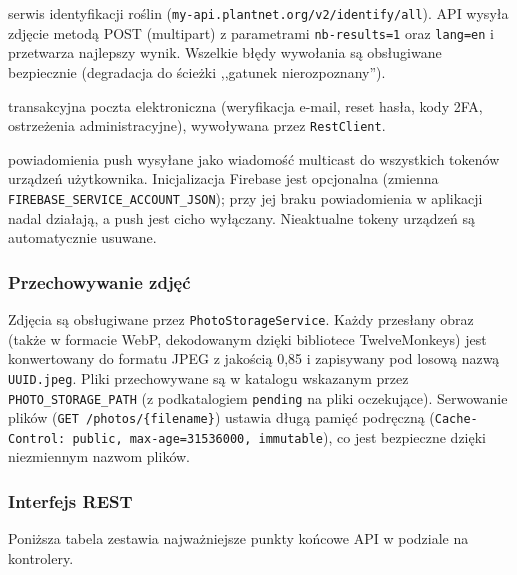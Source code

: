 \documentclass[12pt,a4paper]{article}
\begin{document}
\begin{description}[leftmargin=1.4cm, style=nextline]
    \item[PlantNet] serwis identyfikacji ro\'slin (\texttt{my-api.plantnet.org/v2/identify/all}). API wysy\l{}a zdj\k{e}cie metod\k{a} POST (multipart) z parametrami \texttt{nb-results=1} oraz \texttt{lang=en} i przetwarza najlepszy wynik. Wszelkie b\l{}\k{e}dy wywo\l{}ania s\k{a} obs\l{}ugiwane bezpiecznie (degradacja do \'scie\.zki ,,gatunek nierozpoznany'').
    \item[Brevo] transakcyjna poczta elektroniczna (weryfikacja e-mail, reset has\l{}a, kody 2FA, ostrze\.zenia administracyjne), wywo\l{}ywana przez \texttt{RestClient}.
    \item[Firebase Cloud Messaging] powiadomienia push wysy\l{}ane jako wiadomo\'s\'c multicast do wszystkich token\'ow urz\k{a}dze\'n u\.zytkownika. Inicjalizacja Firebase jest opcjonalna (zmienna \texttt{FIREBASE\_\allowbreak{}SERVICE\_\allowbreak{}ACCOUNT\_\allowbreak{}JSON}); przy jej braku powiadomienia w aplikacji nadal dzia\l{}aj\k{a}, a push jest cicho wy\l{}\k{a}czany. Nieaktualne tokeny urz\k{a}dze\'n s\k{a} automatycznie usuwane.
\end{description}

\subsubsection{Przechowywanie zdj\k{e}\'c}

Zdj\k{e}cia s\k{a} obs\l{}ugiwane przez \texttt{PhotoStorageService}. Ka\.zdy przes\l{}any obraz (tak\.ze w formacie WebP, dekodowanym dzi\k{e}ki bibliotece TwelveMonkeys) jest konwertowany do formatu JPEG z jako\'sci\k{a} 0,85 i zapisywany pod losow\k{a} nazw\k{a} \texttt{UUID.jpeg}. Pliki przechowywane s\k{a} w katalogu wskazanym przez \texttt{PHOTO\_STORAGE\_PATH} (z podkatalogiem \texttt{pending} na pliki oczekuj\k{a}ce). Serwowanie plik\'ow (\texttt{GET /photos/\{filename\}}) ustawia d\l{}ug\k{a} pami\k{e}\'c podr\k{e}czn\k{a} (\texttt{Cache-Control: public, max-age=31536000, immutable}), co jest bezpieczne dzi\k{e}ki niezmiennym nazwom plik\'ow.

\subsubsection{Interfejs REST}

Poni\.zsza tabela zestawia najwa\.zniejsze punkty ko\'ncowe API w podziale na kontrolery.
\end{document}
